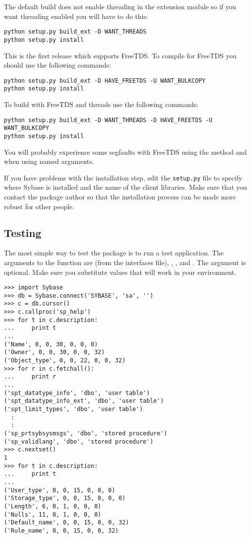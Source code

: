 The default build does not enable threading in the extension module so
if you want threading enabled you will have to do this:

\begin{verbatim}
python setup.py build_ext -D WANT_THREADS
python setup.py install
\end{verbatim}

This is the first release which supports FreeTDS.  To compile for
FreeTDS you should use the following commands:

\begin{verbatim}
python setup.py build_ext -D HAVE_FREETDS -U WANT_BULKCOPY
python setup.py install
\end{verbatim}

To build with FreeTDS and threads use the following commands:

\begin{verbatim}
python setup.py build_ext -D WANT_THREADS -D HAVE_FREETDS -U WANT_BULKCOPY
python setup.py install
\end{verbatim}

You will probably experience some segfaults with FreeTDS using the
  method and when using named
arguments.

If you have problems with the installation step, edit the
\texttt{setup.py} file to specify where Sybase is installed and the
name of the client libraries.  Make sure that you contact the package
author so that the installation process can be made more robust for
other people.

\subsection{Testing}

The most simple way to test the  package is to run a
test application.  The arguments to the 
function are  (from the interfaces file), ,
, and .  The  argument is
optional.  Make sure you substitute values that will work in your
environment.

\begin{verbatim}
>>> import Sybase
>>> db = Sybase.connect('SYBASE', 'sa', '')
>>> c = db.cursor()
>>> c.callproc('sp_help')
>>> for t in c.description:
...     print t
... 
('Name', 0, 0, 30, 0, 0, 0)
('Owner', 0, 0, 30, 0, 0, 32)
('Object_type', 0, 0, 22, 0, 0, 32)
>>> for r in c.fetchall():
...     print r
... 
('spt_datatype_info', 'dbo', 'user table')
('spt_datatype_info_ext', 'dbo', 'user table')
('spt_limit_types', 'dbo', 'user table')
  :
  :
('sp_prtsybsysmsgs', 'dbo', 'stored procedure')
('sp_validlang', 'dbo', 'stored procedure')
>>> c.nextset()
1
>>> for t in c.description:
...     print t
... 
('User_type', 0, 0, 15, 0, 0, 0)
('Storage_type', 0, 0, 15, 0, 0, 0)
('Length', 6, 0, 1, 0, 0, 0)
('Nulls', 11, 0, 1, 0, 0, 0)
('Default_name', 0, 0, 15, 0, 0, 32)
('Rule_name', 0, 0, 15, 0, 0, 32)
\end{verbatim}
